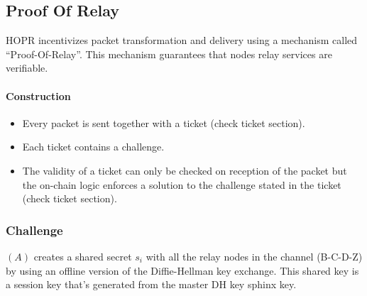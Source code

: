 \subsection{Proof Of Relay}

HOPR incentivizes packet transformation and delivery using a mechanism called “Proof-Of-Relay”.
This mechanism guarantees that nodes relay services are verifiable.
\paragraph{Construction}
\begin{itemize}
    \item Every packet is sent together with a ticket (check ticket section).
    \item Each ticket contains a challenge.
    \item The validity of a ticket can only be checked on reception of the packet but the on-chain logic enforces a solution to the challenge stated in the ticket (check ticket section).
\end{itemize}

\subsubsection{Challenge}
$(A)$ creates a shared secret $s_i$ with all the relay nodes in the channel (B-C-D-Z) by using an offline version of the Diffie-Hellman key exchange. This shared key is a session key that's generated from the master DH key sphinx key.
